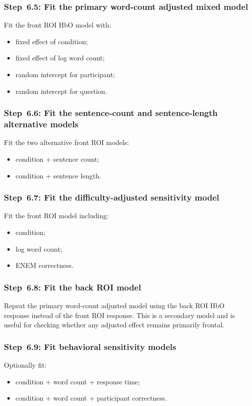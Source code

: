 \documentclass[11pt]{article}
\begin{document}
\subsubsection{Step~6.5: Fit the primary word-count adjusted mixed model}
Fit the front ROI HbO model with:
\begin{itemize}
    \item fixed effect of condition;
    \item fixed effect of log word count;
    \item random intercept for participant;
    \item random intercept for question.
\end{itemize}

\subsubsection{Step~6.6: Fit the sentence-count and sentence-length alternative models}
Fit the two alternative front ROI models:
\begin{itemize}
    \item condition + sentence count;
    \item condition + sentence length.
\end{itemize}

\subsubsection{Step~6.7: Fit the difficulty-adjusted sensitivity model}
Fit the front ROI model including:
\begin{itemize}
    \item condition;
    \item log word count;
    \item ENEM correctness.
\end{itemize}

\subsubsection{Step~6.8: Fit the back ROI model}
Repeat the primary word-count adjusted model using the back ROI HbO response instead of the front ROI response.
This is a secondary model and is useful for checking whether any adjusted effect remains primarily frontal.

\subsubsection{Step~6.9: Fit behavioral sensitivity models}
Optionally fit:
\begin{itemize}
    \item condition + word count + response time;
    \item condition + word count + participant correctness.
\end{itemize}
\end{document}
